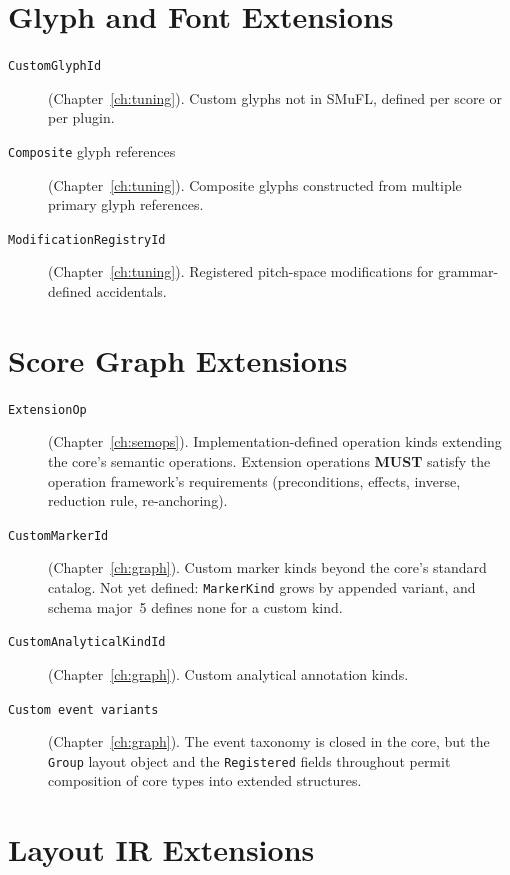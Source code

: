\documentclass[11pt,letterpaper]{report}
\newcounter{requirement}[chapter]
\newcommand{\MUST}{\textbf{MUST}}
\begin{document}
\section{Glyph and Font Extensions}
\label{sec:ext:glyphs}

\begin{description}
  \item[\texttt{CustomGlyphId}] (Chapter~\ref{ch:tuning}).
    Custom glyphs not in SMuFL, defined per score or per plugin.
  \item[\texttt{Composite} glyph references] (Chapter~\ref{ch:tuning}).
    Composite glyphs constructed from multiple primary glyph
    references.
  \item[\texttt{ModificationRegistryId}] (Chapter~\ref{ch:tuning}).
    Registered pitch-space modifications for grammar-defined
    accidentals.
\end{description}

\section{Score Graph Extensions}
\label{sec:ext:graph}

\begin{description}
  \item[\texttt{ExtensionOp}] (Chapter~\ref{ch:semops}).
    Implementation-defined operation kinds extending the core's
    semantic operations. Extension operations \MUST{} satisfy the
    operation framework's requirements (preconditions, effects,
    inverse, reduction rule, re-anchoring).
  \item[\texttt{CustomMarkerId}] (Chapter~\ref{ch:graph}).
    Custom marker kinds beyond the core's standard catalog. Not yet
    defined: \texttt{MarkerKind} grows by appended variant, and schema
    major~5 defines none for a custom kind.
  \item[\texttt{CustomAnalyticalKindId}] (Chapter~\ref{ch:graph}).
    Custom analytical annotation kinds.
  \item[\texttt{Custom event variants}] (Chapter~\ref{ch:graph}).
    The event taxonomy is closed in the core, but the \texttt{Group}
    layout object and the \texttt{Registered} fields throughout
    permit composition of core types into extended structures.
\end{description}

\section{Layout IR Extensions}
\label{sec:ext:layout}
\end{document}
